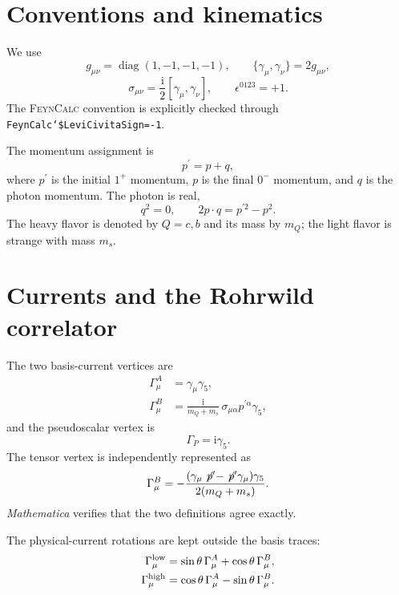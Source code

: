 \documentclass[11pt]{article}
\newcommand{\ii}{\mathrm{i}}
\newcommand{\slashedpp}{\not\!p^{\prime}}
\newcommand{\Mathematica}{\textit{Mathematica}}
\newcommand{\FeynCalc}{\textsc{FeynCalc}}
\begin{document}
\section{Conventions and kinematics}

We use
\begin{equation}
  g_{\mu\nu}=\operatorname{diag}(1,-1,-1,-1),\qquad
  \{\gamma_\mu,\gamma_\nu\}=2g_{\mu\nu},
\end{equation}
\begin{equation}
  \sigma_{\mu\nu}=\frac{\ii}{2}[\gamma_\mu,\gamma_\nu],\qquad
  \epsilon^{0123}=+1.
\end{equation}
The \FeynCalc{} convention is explicitly checked through
\texttt{FeynCalc`\$LeviCivitaSign=-1}.

The momentum assignment is
\begin{equation}
  p^{\prime}=p+q,
\end{equation}
where $p^{\prime}$ is the initial $1^+$ momentum, $p$ is the final $0^-$
momentum, and
$q$ is the photon momentum.  The photon is real,
\begin{equation}
  q^2=0,\qquad 2p\cdot q=p^{\prime 2}-p^2.
\end{equation}
The heavy flavor is denoted by $Q=c,b$ and its mass by $m_Q$; the light flavor
is strange with mass $m_s$.

\section{Currents and the Rohrwild correlator}

The two basis-current vertices are
\begin{align}
  \Gamma^A_\mu
  &=\gamma_\mu\gamma_5,\\
  \Gamma^B_\mu
  &=\frac{\ii}{m_Q+m_s}\,
    \sigma_{\mu\alpha}p^{\prime\alpha}\gamma_5,
\end{align}
and the pseudoscalar vertex is
\begin{equation}
  \Gamma_P=\ii\gamma_5.
\end{equation}
The tensor vertex is independently represented as
\begin{equation}
  \Gamma^B_\mu
  =-\frac{(\gamma_\mu\slashedpp-\slashedpp\gamma_\mu)\gamma_5}
    {2(m_Q+m_s)}.
\end{equation}
\Mathematica{} verifies that the two definitions agree exactly.

The physical-current rotations are kept outside the basis traces:
\begin{align}
  \Gamma^{\rm low}_\mu
  &=\sin\theta\,\Gamma^A_\mu+\cos\theta\,\Gamma^B_\mu,\\
  \Gamma^{\rm high}_\mu
  &=\cos\theta\,\Gamma^A_\mu-\sin\theta\,\Gamma^B_\mu.
\end{align}
\end{document}
